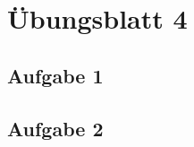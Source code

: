 \documentclass[12pt,a4paper,headsepline]{scrreprt}
\begin{document}


\section*{Übungsblatt 4}

\subsection*{Aufgabe 1}

\subsection*{Aufgabe 2}
\end{document}
